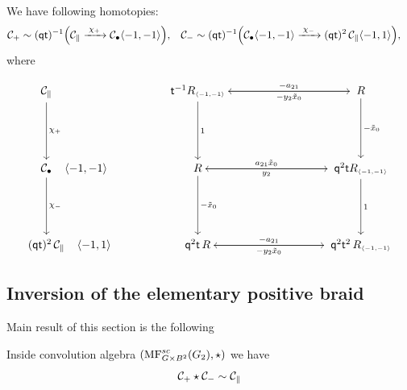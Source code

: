 \begin{proposition}\label{prop: cones} We have following homotopies:
\begin{align*}
\crXp & \sim(\sha\shq\sht)^{-1}\Bigl(\crXpr \xrightarrow{\;\xchp\;}\crXbl\brwsh{-1}{-1} \Bigr), &
\crXn & \sim
\sha(\shq\sht)^{-1}
\Bigl(\crXbl\brwsh{-1}{-1} \xrightarrow{\;\xchm\;}(\shq\sht)^2\,\crXpr\brwsh{-1}{1} \Bigr),%
\end{align*}
where


\begin{equation*}
\begin{tikzcd}[column sep=3cm, row sep=1.75cm]
\crXpr
\arrow{d}{\xchp}
& \sht^{-1}\rgRmomo
\arrow[xshift=-0.35ex]{r}{-\exato}
\arrow{d}{1}
&
\rgR
\arrow[xshift=-0.35ex]{l}{-\yt\txz}
\arrow{d}{-\txz}
\\
\crXbl\arrow[phantom,pos=0.22]{r}{\brwsh{-1}{-1}}
\arrow{d}{\xchm}
& \rgR \arrow[xshift=-0.35ex]{r}{\exato\txz}
\arrow{d}{-\txz}
&
\shq^2\sht\rgRmomo
\arrow[xshift=-0.35ex]{l}{\yt}
\arrow{d}{1}
\\
(\shq\sht)^2\,\crXpr \arrow[phantom,pos=0.22]{r}{\brwsh{-1}{1}}%
& \shq^2\sht\,\rgR \arrow[xshift=-0.35ex]{r}{-\exato}
&
\shq^2\sht^2\,\rgRmomo
\arrow[xshift=-0.35ex]{l}{-\yt\txz}
\end{tikzcd}
\end{equation*}

\end{proposition}


\subsection{Inversion of the elementary positive braid}

Main result of this section is the following

\begin{theorem}\label{thm: two strands} Inside convolution algebra \((\mathrm{MF}^{sc}_{G\times B^2}(G_2),\star)\) we have
\[
\mathcal{C}_{+} \star \mathcal{C}_{-} \sim \mathcal{C}_{\parallel}
\]
\end{theorem}


